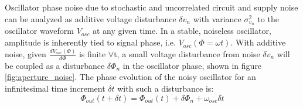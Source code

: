 	 Oscillator phase noise due to stochastic and uncorrelated circuit and supply noise can be analyzed as additive voltage disturbance $\delta v_n$ with variance $\sigma_{v_n}^2$ to the oscillator waveform $V_{osc}$ at any given time.  In a stable, noiseless oscillator, amplitude is inherently tied to signal phase, i.e. $V_{osc}(\Phi=\omega t)$. With additive noise, given $\frac{dV_{osc}(\Phi)}{d\Phi}$ is finite $\forall$t, a small voltage disturbance from noise $\delta v_{n}$ will be coupled as a disturbance $\delta\Phi_{n}$ in the oscillator phase, shown in figure \ref{fig:aperture_noise}. The phase evolution of the noisy oscillator for an infinitesimal time increment $\delta t$  with such a disturbance is:
	 \begin{equation}
		\Phi_{out}(t+\delta t) = \Phi_{out}(t) + \delta\Phi_n + \omega_{osc}\delta t \label{eq:rwalk_ph}
	 \end{equation}

